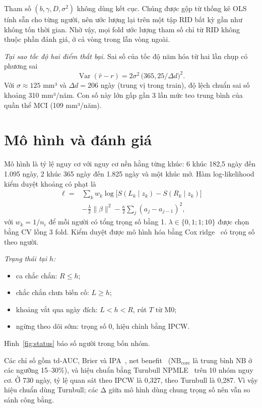 \documentclass[conference]{IEEEtran}
\begin{document}
Tham số $(b,\gamma,D,\sigma^2)$ không dùng kết cục. Chúng được gộp từ thống kê OLS tính sẵn cho từng người, nên ước lượng lại trên một tập RID bất kỳ gần như không tốn thời gian. Nhờ vậy, mọi fold ước lượng tham số chỉ từ RID không thuộc phần đánh giá, ở cả vòng trong lẫn vòng ngoài.

\textit{Tại sao tốc độ hai điểm thất bại.} Sai số của tốc độ năm hóa từ hai lần chụp có phương sai
\[
\operatorname{Var}(\hat r-r)=2\sigma^2\,\big(365{,}25/\Delta d\big)^2 .
\]
Với $\sigma\approx125$ mm³ và $\Delta d=206$ ngày (trung vị trong train), độ lệch chuẩn sai số khoảng 310 mm³/năm. Con số này lớn gấp gần 3 lần mức teo trung bình của quần thể MCI (109 mm³/năm).

\section{Mô hình và đánh giá}
Mô hình là tỷ lệ nguy cơ với nguy cơ nền hằng từng khúc: 6 khúc 182,5 ngày đến 1.095 ngày, 2 khúc 365 ngày đến 1.825 ngày và một khúc mở. Hàm log-likelihood kiểm duyệt khoảng có phạt là
\begin{equation}
\begin{aligned}
\ell={}&\textstyle\sum_k w_k\log\big[S(L_k\mid z_k)-S(R_k\mid z_k)\big]\\
&-\tfrac{\lambda}{2}\lVert\beta\rVert^2-\tfrac{\kappa}{2}\textstyle\sum_j(a_j-a_{j-1})^2,
\end{aligned}
\end{equation}
với $w_k=1/n_i$ để mỗi người có tổng trọng số bằng 1. $\lambda\in\{0{,}1;1;10\}$ được chọn bằng CV lồng 3 fold. Kiểm duyệt được mô hình hóa bằng Cox ridge~\cite{cox} có trọng số theo người.

\textit{Trạng thái tại $h$:}
\begin{itemize}
\item ca chắc chắn: $R\le h$;
\item chắc chắn chưa biến cố: $L\ge h$;
\item khoảng vắt qua ngày đích: $L<h<R$, rút $T$ từ M0;
\item ngừng theo dõi sớm: trọng số 0, hiệu chỉnh bằng IPCW.
\end{itemize}
Hình~\ref{fig:status} báo số người trong bốn nhóm.

Các chỉ số gồm td-AUC, Brier và IPA~\cite{ipa}, net benefit~\cite{dca} ($\mathrm{NB_{core}}$ là trung bình NB ở các ngưỡng 15–30\%), và hiệu chuẩn bằng Turnbull NPMLE~\cite{turnbull} trên 10 nhóm nguy cơ. Ở 730 ngày, tỷ lệ quan sát theo IPCW là 0,327, theo Turnbull là 0,287. Vì vậy hiệu chuẩn dùng Turnbull; các Δ giữa mô hình dùng chung trọng số nên vẫn so sánh công bằng.
\end{document}
